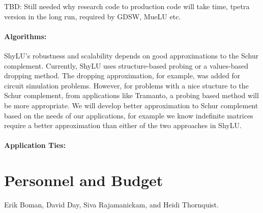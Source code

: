 \documentclass[10pt]{amsart}
\begin{document}
TBD: Still needed why research code to production code will take time, tpetra
version in the long run, required by GDSW, MueLU etc.

\paragraph{\bf{Algorithms}:} ShyLU's robustness and scalability depends on good
approximations to the Schur complement. Currently, ShyLU uses 
structure-based probing
or a values-based dropping method. The dropping approximation, for
example, was added for circuit simulation problems. However, for problems
with a nice stucture to the Schur complement, from applications like Tramanto,
a probing based method will be more appropriate. We will develop better
approximation to Schur complement based on the needs of our applications, for
example we know indefinite matrices require a better approximation than either
of the two approaches in ShyLU.  

\paragraph{\bf{Application Ties}:}


\section{Personnel and Budget}
Erik Boman, David Day, Siva Rajamanickam, and Heidi Thornquist.
\end{document}
